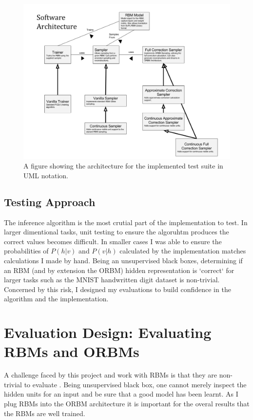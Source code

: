 \begin{figure}[h]
\begin{center}
  \includegraphics[width = 1\textwidth]{Assets/ENGR489-Architecture.png}
\caption{A figure showing the architecture for the implemented test suite in UML notation.}
\label{F:Prog-Arch}
\end{center}
\end{figure}

\subsection{Testing Approach}

The inference algorithm is the most crutial part of the implementation to test. In larger dimentional tasks, unit testing to ensure the algoruhtm produces the correct values becomes difficult. In smaller cases I was able to ensure the probabilities of $P(h|v)$ and $P(v|h)$ calculated by the implementation matches calculations I made by hand. Being an unsupervised black boxes, determining if an RBM (and by extension the ORBM) hidden representation is `correct` for larger tasks such as the MNIST handwritten digit dataset is non-trivial. Concerned by this risk, I designed my evaluations to build confidence in the algorithm and the implementation.

\section{Evaluation Design: Evaluating RBMs and ORBMs}

  A challenge faced by this project and work with RBMs is that they are non-trivial to evaluate \todocite{}. Being unsupervised black box, one cannot merely inspect the hidden units for an input and be sure that a good model has been learnt. As I plug RBMs into the ORBM architecture it is important for the overal results that the RBMs are well trained.

